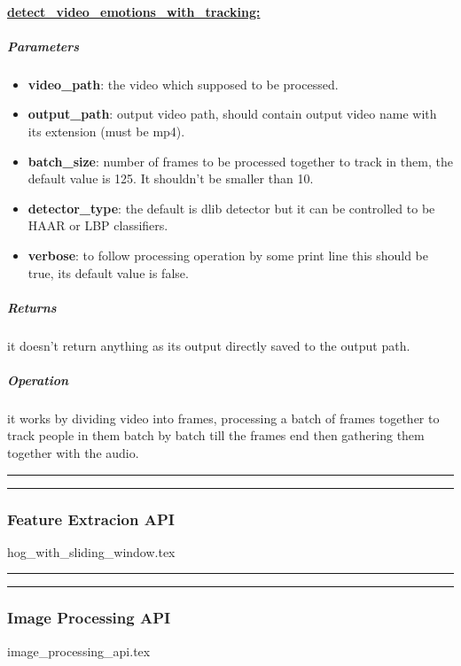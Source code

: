 \paragraph{\underline{detect\_video\_emotions\_with\_tracking:}}
\subparagraph{Parameters}
\begin{changemargin}{0.5cm}{0cm} 
\begin{itemize}
	\item  \textbf{video\_path}: the video which supposed to be processed.
	\item  \textbf{output\_path}: output video path, should contain output video name with its extension (must be mp4).
	\item  \textbf{batch\_size}: number of frames to be processed together to track in them, the default value is 125. \newline It shouldn't be smaller than 10.
	\item \textbf{detector\_type}: the default is dlib detector but it can be controlled to be HAAR or LBP classifiers.
	\item  \textbf{verbose}: to follow processing operation by some print line this should be true, its default value is false.
\end{itemize}
\end{changemargin}

\subparagraph{Returns}
\begin{changemargin}{1cm}{0cm}
	it doesn't return anything as its output directly saved to the output path.
\end{changemargin}


\subparagraph{Operation}
\begin{changemargin}{1cm}{0cm}
it works by dividing video into frames, processing a batch of frames together to track people in them batch by batch till the frames end then gathering them together with the audio.
\end{changemargin}

\hrule\vspace{0.5mm}\hrule
\subsubsection{Feature Extracion API}
{hog_with_sliding_window.tex}

\hrule\vspace{0.5mm}\hrule
\subsubsection{Image Processing API}
{image_processing_api.tex}